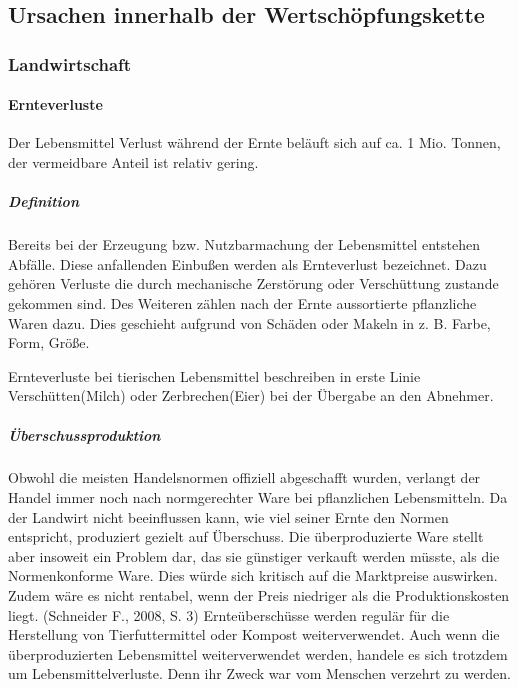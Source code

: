 \subsection{Ursachen innerhalb der Wertschöpfungskette}
\subsubsection{Landwirtschaft}
\paragraph{Ernteverluste}
Der Lebensmittel Verlust während der Ernte beläuft sich auf ca. 1 Mio. Tonnen, der vermeidbare Anteil ist relativ gering. %

\subparagraph{Definition}	
Bereits bei der Erzeugung bzw. Nutzbarmachung der Lebensmittel entstehen Abfälle. Diese anfallenden Einbußen werden als Ernteverlust bezeichnet. Dazu gehören Verluste die durch mechanische Zerstörung oder Verschüttung zustande gekommen sind. Des Weiteren zählen nach der Ernte aussortierte pflanzliche Waren dazu. Dies geschieht aufgrund von Schäden oder Makeln in z. B. Farbe, Form, Größe. %

Ernteverluste bei tierischen Lebensmittel beschreiben in erste Linie Verschütten(Milch) oder Zerbrechen(Eier) bei der Übergabe an den Abnehmer. %
 
\subparagraph{Überschussproduktion}	
Obwohl die meisten Handelsnormen offiziell abgeschafft wurden, verlangt der Handel immer noch nach normgerechter Ware bei pflanzlichen Lebensmitteln. Da der Landwirt nicht beeinflussen kann, wie viel seiner Ernte den Normen entspricht, produziert gezielt auf Überschuss. %
Die überproduzierte Ware stellt aber insoweit ein Problem dar, das sie günstiger verkauft werden müsste, als die Normenkonforme Ware. Dies würde sich kritisch auf die Marktpreise auswirken. Zudem wäre es nicht rentabel, wenn der Preis niedriger als die Produktionskosten liegt. (Schneider F., 2008, S. 3) Ernteüberschüsse werden regulär für die Herstellung von Tierfuttermittel oder Kompost weiterverwendet.%
Auch wenn die überproduzierten Lebensmittel weiterverwendet werden, handele es sich trotzdem um Lebensmittelverluste. Denn ihr Zweck war vom Menschen verzehrt zu werden. 
 

